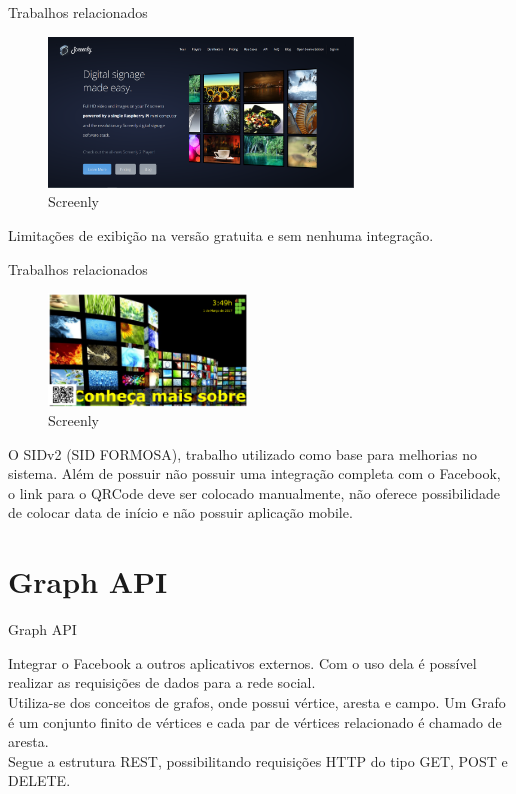 \documentclass{aula-ifb}
\begin{document}
\begin{frame}{Trabalhos relacionados}
	\begin{figure}[h]
    	\includegraphics[height=4cm]{figuras/screenly.png}
    	\caption{Screenly}
	\end{figure}
	\begin{center}
	Limitações de exibição na versão gratuita e sem nenhuma integração.
	\end{center}
\end{frame}

\begin{frame}{Trabalhos relacionados}
\begin{figure}[h]
    	\includegraphics[height=3cm]{figuras/SID.png}
    	\caption{Screenly}
	\end{figure}
	
	\begin{center}
O SIDv2 (SID FORMOSA), trabalho utilizado como base para melhorias no sistema. Além de possuir não possuir uma integração completa com o Facebook, o link para o QRCode deve ser colocado manualmente, não oferece possibilidade de colocar data de início e não possuir aplicação mobile.
\end{center}
\end{frame}

\section{Graph API}
\begin{frame}{Graph API}
	\begin{center}
	Integrar o Facebook a outros aplicativos externos. Com o uso dela é possível realizar as requisições de dados para a rede social.\\
	\vspace{20px}
	Utiliza-se dos conceitos de grafos, onde possui vértice, aresta e campo. Um Grafo é um conjunto finito de vértices e cada par de vértices relacionado é chamado de aresta. \\
	\vspace{20px}
	Segue a estrutura REST, possibilitando requisições HTTP do tipo GET, POST e DELETE. 
	\end{center}
\end{frame}
\end{document}
